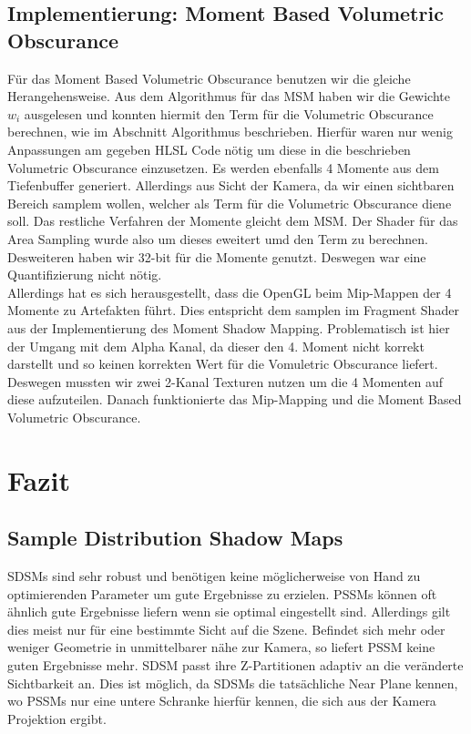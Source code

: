 \documentclass[runningheaders,a4paper]{llncs}
\begin{document}
\subsection{Implementierung: Moment Based Volumetric Obscurance}
Für das Moment Based Volumetric Obscurance benutzen wir die gleiche Herangehensweise.
Aus dem Algorithmus für das MSM haben wir die Gewichte $w_i$ ausgelesen und konnten hiermit den Term für die Volumetric Obscurance berechnen, wie im Abschnitt Algorithmus beschrieben. Hierfür waren nur wenig Anpassungen am gegeben HLSL Code nötig um diese in die beschrieben Volumetric Obscurance einzusetzen. Es werden ebenfalls 4 Momente aus dem Tiefenbuffer generiert. Allerdings aus Sicht der Kamera, da wir einen sichtbaren Bereich samplem wollen, welcher als Term für die Volumetric Obscurance diene soll. Das restliche Verfahren der Momente gleicht dem MSM. Der Shader für das Area Sampling wurde also um dieses eweitert umd den Term zu berechnen.\\
Desweiteren haben wir 32-bit für die Momente genutzt. Deswegen war eine Quantifizierung nicht nötig.\\
Allerdings hat es sich herausgestellt, dass die OpenGL beim Mip-Mappen der 4 Momente zu Artefakten führt. Dies entspricht dem samplen im Fragment Shader aus der Implementierung des Moment Shadow Mapping. Problematisch ist hier der Umgang mit dem Alpha Kanal, da dieser den 4. Moment nicht korrekt darstellt und so keinen  korrekten Wert für die Vomuletric Obscurance liefert. Deswegen mussten wir zwei 2-Kanal Texturen nutzen um die 4 Momenten auf diese aufzuteilen. Danach funktionierte das Mip-Mapping und die Moment Based Volumetric Obscurance.



\section{Fazit}


\subsection{Sample Distribution Shadow Maps}
SDSMs sind sehr robust und benötigen keine möglicherweise von Hand zu optimierenden Parameter um gute Ergebnisse zu erzielen.
PSSMs können oft ähnlich gute Ergebnisse liefern wenn sie optimal eingestellt sind.
Allerdings gilt dies meist nur für eine bestimmte Sicht auf die Szene.
Befindet sich mehr oder weniger Geometrie in unmittelbarer nähe zur Kamera, so liefert PSSM keine guten Ergebnisse mehr.
SDSM passt ihre Z-Partitionen adaptiv an die veränderte Sichtbarkeit an.
Dies ist möglich, da SDSMs die tatsächliche Near Plane kennen, wo PSSMs nur eine untere Schranke hierfür kennen, die sich aus der Kamera Projektion ergibt.
\end{document}
